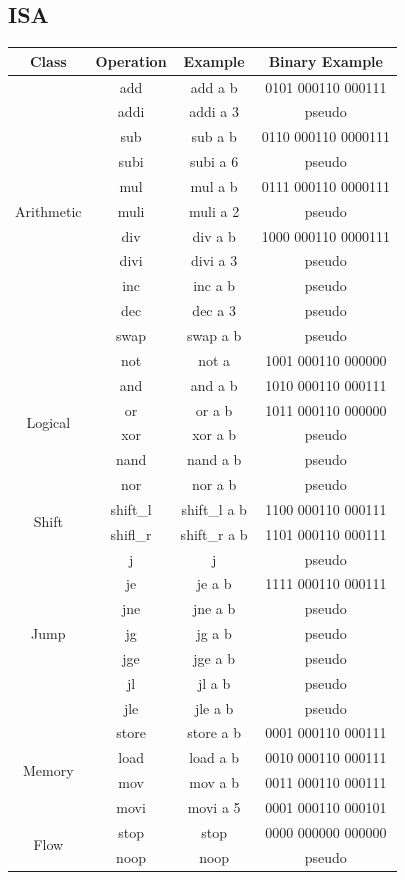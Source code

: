 \documentclass[12pt,a4paper]{scrartcl}
\begin{document}
\subsection{ISA}
\begin{tabular}{|c|c|c|c|}
\hline
Class & Operation & Example & Binary Example\\
\hline
\multirow{11}{*}{Arithmetic} & add & add a b & 0101 000110 000111 \\
& addi & addi a 3 & pseudo \\
& sub & sub a b & 0110 000110 0000111\\
& subi & subi a 6 & pseudo\\
& mul & mul a b & 0111 000110 0000111\\
& muli & muli a 2 & pseudo\\
& div & div a b & 1000 000110 0000111\\
& divi & divi a 3 & pseudo\\
& inc & inc a b & pseudo\\
& dec & dec a 3 & pseudo\\
& swap & swap a b & pseudo\\
\hline
\multirow{6}{*}{Logical} & not & not a & 1001 000110 000000\\
& and & and a b & 1010 000110 000111\\
& or & or a b & 1011 000110 000000\\
& xor & xor a b & pseudo\\
& nand & nand a b & pseudo\\
& nor & nor a b & pseudo\\
\hline
\multirow{2}{*}{Shift} & shift\_l & shift\_l a b & 1100 000110 000111\\
& shifl\_r & shift\_r a b & 1101 000110 000111\\
\hline
\multirow{7}{*}{Jump} & j & j & pseudo \\
& je & je a b & 1111 000110 000111 \\
& jne & jne a b & pseudo \\
& jg & jg a b & pseudo \\
& jge & jge a b & pseudo \\
& jl & jl a b & pseudo \\
& jle & jle a b & pseudo \\
\hline
\multirow{4}{*}{Memory} & store & store a b & 0001 000110 000111\\
& load & load a b & 0010 000110 000111\\
& mov & mov a b & 0011 000110 000111\\
& movi & movi a 5 & 0001 000110 000101\\
\hline
\multirow{2}{*}{Flow} & stop & stop & 0000 000000 000000 \\
& noop & noop & pseudo \\
\hline
\end{tabular}
\end{document}
